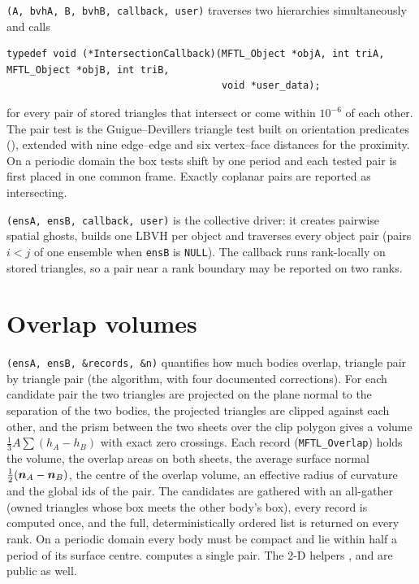 \texttt{(A, bvhA, B, bvhB, callback, user)} traverses two hierarchies
simultaneously and calls
\begin{lstlisting}[numbers=none]
typedef void (*IntersectionCallback)(MFTL_Object *objA, int triA, MFTL_Object *objB, int triB,
                                     void *user_data);
\end{lstlisting}
for every pair of stored triangles that intersect or come within $10^{-6}$ of each other. The
pair test is the Guigue--Devillers triangle test built on orientation predicates
(), extended with nine edge--edge and six vertex--face distances for
the proximity. On a periodic domain the box tests shift by one period and each tested pair is
first placed in one common frame. Exactly coplanar pairs are reported as intersecting.

\texttt{(ensA, ensB, callback, user)} is the collective driver:
it creates pairwise spatial ghosts, builds one LBVH per object and traverses every object pair
(pairs $i<j$ of one ensemble when \texttt{ensB} is \texttt{NULL}). The callback runs rank-locally
on stored triangles, so a pair near a rank boundary may be reported on two ranks.

\section{Overlap volumes}

\texttt{(ensA, ensB, \&records, \&n)} quantifies how much bodies
overlap, triangle pair by triangle pair (the \mftlone{} algorithm, with four documented
corrections). For each candidate pair the two triangles are projected on the plane normal to the
separation of the two bodies, the projected triangles are clipped against each other, and the
prism between the two sheets over the clip polygon gives a volume
$\tfrac13 A\sum(h_A-h_B)$ with exact zero crossings. Each record (\texttt{MFTL\_Overlap}) holds the
volume, the overlap areas on both sheets, the average surface normal
$\tfrac12(\boldsymbol{n}_A-\boldsymbol{n}_B)$, the centre of the overlap volume, an effective radius of
curvature and the global ids of the pair. The candidates are gathered with an all-gather
(owned triangles whose box meets the other body's box), every record is computed once, and the
full, deterministically ordered list is returned on every rank. On a periodic domain every body
must be compact and lie within half a period of its surface centre. 
computes a single pair. The 2-D helpers ,  and
 are public as well.

